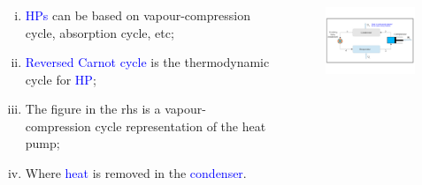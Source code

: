 \documentclass[10pt,compress]{beamer}
\begin{document}
\begin{frame}
 \frametitle{}
  \begin{columns}
   \begin{column}[c]{0.45\linewidth}
  \begin{enumerate}[(i)]
   \item <1-> \textcolor{blue}{HPs} can be based on vapour-compression cycle, absorption cycle, etc;
   \item <2-> \textcolor{blue}{Reversed Carnot cycle} is the thermodynamic cycle for \textcolor{blue}{HP};
   \item <3-> The figure in the rhs is a vapour-compression cycle representation of the heat pump;
   \item <4-> Where \textcolor{blue}{heat} is removed in the \textcolor{blue}{condenser}.
  \end{enumerate}
   \end{column}
   \begin{column}[c]{0.55\linewidth}\vspace{-1.cm}
    \begin{figure}%
     \begin{center}
      \includegraphics[width=6.5cm,clip]{./Pics/Overview_Refrig36}
     \end{center}
    \end{figure}  
   \end{column}  
  \end{columns}
\end{frame}
\end{document}
